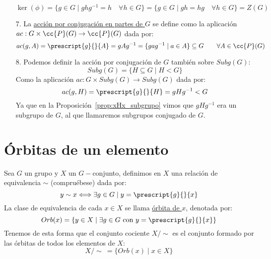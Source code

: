 \begin{ejemplo}
\begin{enumerate}
\begin{equation*}
                \ker(\phi) = \{g\in G \mid ghg^{-1} = h \quad \forall h\in G\} = \{g\in G \mid gh = hg \quad \forall h\in G\} = Z(G)
            \end{equation*}
        \item[7.] La \underline{acción por conjugación en partes de $G$} se define como la aplicación \newline $ac:G\times \cc{P}(G) \to \cc{P}(G)$ dada por:
            \begin{equation*}
                ac(g,A) = \prescript{g}{}{A} = gAg^{-1} = \{gag^{-1} \mid a\in A\} \subseteq G \qquad \forall A\in \cc{P}(G)
            \end{equation*}
        \item[8.] Podemos definir la acción por conjugación de $G$ también sobre $Subg(G)$:
            \begin{equation*}
                Subg(G) = \{H\subseteq G \mid H<G\}
            \end{equation*}
            Como la aplicación $ac:G\times Subg(G) \to Subg(G)$ dada por:
            \begin{equation*}
                ac(g,H) = \prescript{g}{}{H} = gHg^{-1} < G
            \end{equation*}
            Ya que en la Proposición~\ref{prop:xHx_subgrupo} vimos que $gHg^{-1}$ era un subgrupo de $G$, al que llamaremos subgrupos conjugado de $G$.
    \end{enumerate}
\end{ejemplo}

\section{Órbitas de un elemento}

\begin{definicion}[Órbita]
    Sea $G$ un grupo y $X$ un $G-$conjunto, definimos en $X$ una relación de equivalencia $\sim$ (compruébese) dada por:
    \begin{equation*}
        y\sim x \Longleftrightarrow \exists g\in G \mid y = \prescript{g}{}{x}
    \end{equation*}
    La clase de equivalencia de cada $x\in X$ se llama \underline{órbita de $x$}, denotada por:
    \begin{equation*}
        Orb(x) = \{y\in X \mid \exists g\in G \text{\ con\ } y=\prescript{g}{}{x}\}
    \end{equation*}
    Tenemos de esta forma que el conjunto cociente $X/\sim$ es el conjunto formado por las órbitas de todos los elementos de $X$:
    \begin{equation*}
        X/\sim\ = \{Orb(x) \mid x\in X\}
    \end{equation*}
\end{definicion}

